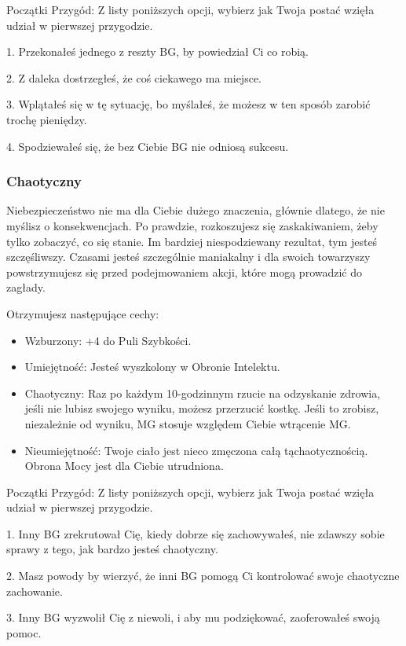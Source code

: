 Początki Przygód: Z listy poniższych opcji, wybierz jak Twoja postać wzięła udział w pierwszej przygodzie.

1. Przekonałeś jednego z reszty BG, by powiedział Ci co robią.

2. Z daleka dostrzegłeś, że coś ciekawego ma miejsce.

3. Wplątałeś się w tę sytuację, bo myślałeś, że możesz w ten sposób zarobić trochę pieniędzy.

4. Spodziewałeś się, że bez Ciebie BG nie odniosą sukcesu.

\subsubsection{Chaotyczny}

Niebezpieczeństwo nie ma dla Ciebie dużego znaczenia, głównie dlatego, że nie myślisz o konsekwencjach. Po prawdzie, rozkoszujesz się zaskakiwaniem, żeby tylko zobaczyć, co się stanie. Im bardziej niespodziewany rezultat, tym jesteś szczęśliwszy. Czasami jesteś szczególnie maniakalny i dla swoich towarzyszy powstrzymujesz się przed podejmowaniem akcji, które mogą prowadzić do zagłady. 

Otrzymujesz następujące cechy:
\begin{itemize}
 \item Wzburzony: +4 do Puli Szybkości.
 \item Umiejętność: Jesteś wyszkolony w Obronie Intelektu.
 \item Chaotyczny: Raz po każdym 10-godzinnym rzucie na odzyskanie zdrowia, jeśli nie lubisz swojego wyniku, możesz przerzucić kostkę. Jeśli to zrobisz, niezależnie od wyniku, MG stosuje względem Ciebie wtrącenie MG.
\item Nieumiejętność: Twoje ciało jest nieco zmęczona całą tąchaotycznością. Obrona Mocy jest dla Ciebie utrudniona.
\end{itemize}

Początki Przygód: Z listy poniższych opcji, wybierz jak Twoja postać wzięła udział w pierwszej przygodzie.

1. Inny BG zrekrutował Cię, kiedy dobrze się zachowywałeś, nie zdawszy sobie sprawy z tego, jak bardzo jesteś chaotyczny.

2. Masz powody by wierzyć, że inni BG pomogą Ci kontrolować swoje chaotyczne zachowanie.

3. Inny BG wyzwolił Cię z niewoli, i aby mu podziękować, zaoferowałeś swoją pomoc.

